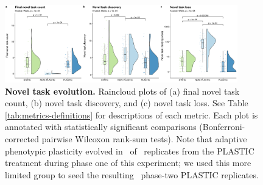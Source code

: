 \begin{figure}[h!]
    \centering
    \includegraphics[width=0.9\textwidth]{media/complex-traits-magnitude-panel.pdf}
    \caption{\small
    \textbf{Novel task evolution.}
    Raincloud plots of 
    (a) final novel task count,
    (b) novel task discovery,
    and (c) novel task loss.
    See Table \ref{tab:metrics-definitions} for descriptions of each metric.
    Each plot is annotated with statistically significant comparisons (Bonferroni-corrected pairwise Wilcoxon rank-sum tests).
    Note that adaptive phenotypic plasticity evolved in \novelTraitsPlasticReps\ of \novelTraitsReplicates\ replicates from the PLASTIC treatment during phase one of this experiment; we used this more limited group to seed the resulting \novelTraitsPlasticReps\ phase-two PLASTIC replicates.
    }
    \label{fig:complex-traits-magnitude}
\end{figure}